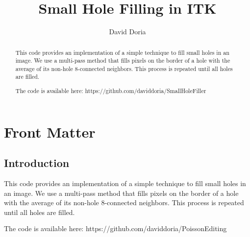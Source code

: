 \documentclass{InsightArticle}
\title{Small Hole Filling in ITK}
\author{David Doria}
\newcommand{\IJhandlerIDnumber}{3257}
\begin{document}
%
% 
\IJhandlefooter{\IJhandlerIDnumber}


\ifpdf
\else
\fi


\maketitle


\ifhtml
\chapter*{Front Matter\label{front}}
\fi


\begin{abstract}
\noindent
This code provides an implementation of a simple technique to fill small holes in an image. We use a multi-pass method that fills pixels on the border of a hole with the average of its non-hole 8-connected neighbors. This process is repeated until all holes are filled.

The code is available here: https://github.com/daviddoria/SmallHoleFiller

\end{abstract}

\IJhandlenote{\IJhandlerIDnumber}

\tableofcontents

\section{Introduction}
This code provides an implementation of a simple technique to fill small holes in an image. We use a multi-pass method that fills pixels on the border of a hole with the average of its non-hole 8-connected neighbors. This process is repeated until all holes are filled.

The code is available here: https://github.com/daviddoria/PoissonEditing
\end{document}

